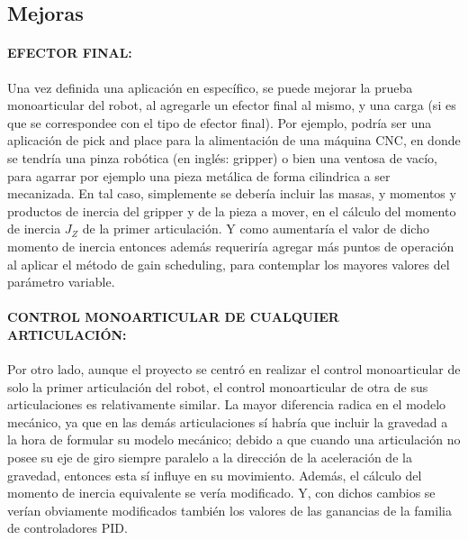 \documentclass{article}
\begin{document}
\begin{sloppypar}

\subsection{Mejoras}
\label{sec:Mejoras}

\paragraph{EFECTOR FINAL:}
\label{sec:EFECTOR FINAL:}
\hfill

Una vez definida una aplicación en específico, se puede mejorar la prueba monoarticular del robot, al agregarle un efector final al mismo, y una carga (si es que se correspondee con el tipo de efector final). Por ejemplo, podría ser una aplicación de pick and place para la alimentación de una máquina CNC, en donde se tendría una pinza robótica (en inglés: gripper) o bien una ventosa de vacío, para agarrar por ejemplo una pieza metálica de forma cilindrica a ser mecanizada. En tal caso, simplemente se debería incluir las masas, y momentos y productos de inercia del gripper y de la pieza a mover, en el cálculo del momento de inercia $J_Z$ de la primer articulación. Y como aumentaría el valor de dicho momento de inercia entonces además requeriría agregar más puntos de operación al aplicar el método de gain scheduling, para contemplar los mayores valores del parámetro variable.


\paragraph{CONTROL MONOARTICULAR DE CUALQUIER ARTICULACIÓN:}
\label{sec:CONTROL MONOARTICULAR DE CUALQUIER ARTICULACIÓN:}
\hfill

Por otro lado, aunque el proyecto se centró en realizar el control monoarticular de solo la primer articulación del robot, el control monoarticular de otra de sus articulaciones es relativamente similar. La mayor diferencia radica en el modelo mecánico, ya que en las demás articulaciones sí habría que incluir la gravedad a la hora de formular su modelo mecánico; debido a que cuando una articulación no posee su eje de giro siempre paralelo a la dirección de la aceleración de la gravedad, entonces esta sí influye en su movimiento. Además, el cálculo del momento de inercia equivalente se vería modificado. Y, con dichos cambios se verían obviamente modificados también los valores de las ganancias de la familia de controladores PID.










\end{sloppypar}
\end{document}
